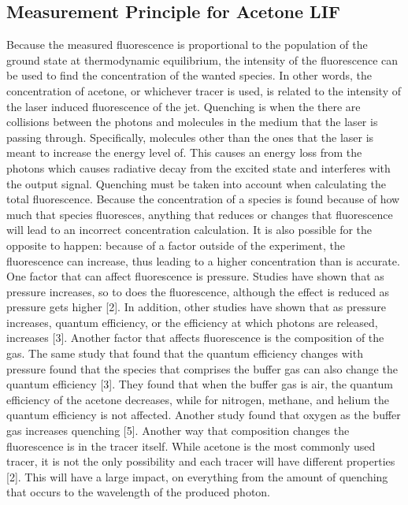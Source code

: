 \documentclass[preview,12pt]{article}
\begin{document}
\subsection*{Measurement Principle for Acetone LIF}
Because the measured fluorescence is proportional to the population of the ground state at thermodynamic equilibrium, the intensity of the fluorescence can be used to find the concentration of the wanted species.  In other words, the concentration of acetone, or whichever tracer is used, is related to the intensity of the laser induced fluorescence of the jet. 
\newline
\indent Quenching is when the there are collisions between the photons and molecules in the medium that the laser is passing through.  Specifically, molecules other than the ones that the laser is meant to increase the energy level of.  This causes an energy loss from the photons which causes radiative decay from the excited state and interferes with the output signal.  Quenching must be taken into account when calculating the total fluorescence.  Because the concentration of a species is found because of how much that species fluoresces, anything that reduces  or changes that fluorescence will lead to an incorrect concentration calculation.  It is also possible for the opposite to happen: because of a factor outside of the experiment, the fluorescence can increase, thus leading to a higher concentration than is accurate.  \newline
\indent One factor that can affect fluorescence is pressure.  Studies have shown that as pressure increases, so to does the fluorescence, although the effect is reduced as pressure gets higher [2].  In addition, other studies have shown that as pressure increases, quantum efficiency, or the efficiency at which photons are released, increases [3].\newline
\indent Another factor that affects fluorescence is the composition of the gas. The same study that found that the quantum efficiency changes with pressure found that the species that comprises the buffer gas can also change the quantum efficiency [3].  They found that when the buffer gas is air, the quantum efficiency of the acetone decreases, while for nitrogen, methane, and helium the quantum efficiency is not affected.  Another study found that oxygen as the buffer gas increases quenching [5].  Another way that composition changes the fluorescence is in the tracer itself.  While acetone is the most commonly used tracer, it is not the only possibility and each tracer will have different properties [2].  This will have a large impact, on everything from the amount of quenching that occurs to the wavelength of the produced photon. \newline
\end{document}
